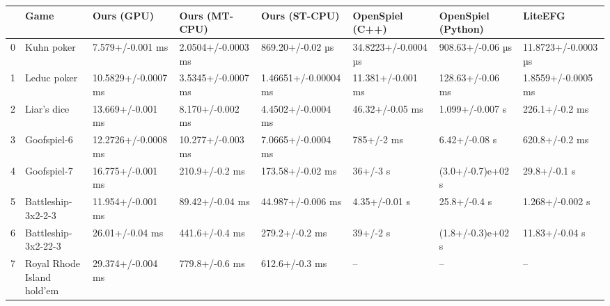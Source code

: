 \begin{tabular}{llllllll}
\toprule
 & Game & Ours (GPU) & Ours (MT-CPU) & Ours (ST-CPU) & OpenSpiel (C++) & OpenSpiel (Python) & LiteEFG \\
\midrule
0 & Kuhn poker & 7.579+/-0.001 ms & 2.0504+/-0.0003 ms & 869.20+/-0.02 µs & 34.8223+/-0.0004 µs & 908.63+/-0.06 µs & 11.8723+/-0.0003 µs \\
1 & Leduc poker & 10.5829+/-0.0007 ms & 3.5345+/-0.0007 ms & 1.46651+/-0.00004 ms & 11.381+/-0.001 ms & 128.63+/-0.06 ms & 1.8559+/-0.0005 ms \\
2 & Liar's dice & 13.669+/-0.001 ms & 8.170+/-0.002 ms & 4.4502+/-0.0004 ms & 46.32+/-0.05 ms & 1.099+/-0.007 s & 226.1+/-0.2 ms \\
3 & Goofspiel-6 & 12.2726+/-0.0008 ms & 10.277+/-0.003 ms & 7.0665+/-0.0004 ms & 785+/-2 ms & 6.42+/-0.08 s & 620.8+/-0.2 ms \\
4 & Goofspiel-7 & 16.775+/-0.001 ms & 210.9+/-0.2 ms & 173.58+/-0.02 ms & 36+/-3 s & (3.0+/-0.7)e+02 s & 29.8+/-0.1 s \\
5 & Battleship-3x2-2-3 & 11.954+/-0.001 ms & 89.42+/-0.04 ms & 44.987+/-0.006 ms & 4.35+/-0.01 s & 25.8+/-0.4 s & 1.268+/-0.002 s \\
6 & Battleship-3x2-22-3 & 26.01+/-0.04 ms & 441.6+/-0.4 ms & 279.2+/-0.2 ms & 39+/-2 s & (1.8+/-0.3)e+02 s & 11.83+/-0.04 s \\
7 & Royal Rhode Island hold'em & 29.374+/-0.004 ms & 779.8+/-0.6 ms & 612.6+/-0.3 ms & -- & -- & -- \\
\bottomrule
\end{tabular}
